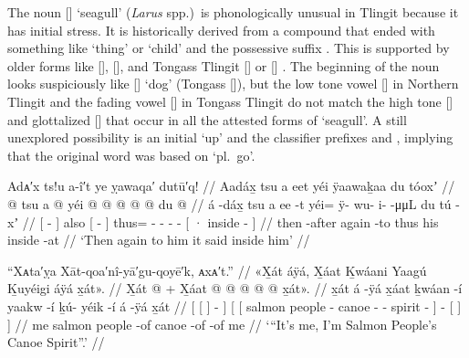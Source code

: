 The noun  [] ‘seagull’ (\textit{Larus} spp.)\ is phonologically unusual in Tlingit because it has initial stress.
It is historically derived from a compound that ended with something like  ‘thing’ or  ‘child’ and the possessive suffix .
This is supported by older forms like  [],  [], and Tongass Tlingit  [] or  [] \parencite[all][f06/66]{leer:1973}.
The beginning of the noun looks suspiciously like  [] ‘dog’ (Tongass  []), but the low tone vowel [] in Northern Tlingit and the fading vowel [] in Tongass Tlingit do not match the high tone [] and glottalized [] that occur in all the attested forms of ‘seagull’.
A still unexplored possibility is an initial  ‘up’ and the classifier prefixes  and , implying that the original word was based on  ‘pl.\ go’.

\ex\label{ex:100-163-again-spoke}%
%
\begingl
	\glpreamble	Adᴀ′x ts!u a-î′t ye ỵawaqa′ dutū′q! //
	\glpreamble	Aadáx̱ tsu a eet yéi ÿaawaḵaa du tóoxʼ //
	\gla	{}  @ {} {} tsu
		{} a  @ {} {}
		yéi @  @ {} @ {} @ {} @ {}
		{} du  @ {} {} //
	\glb	{} á -dáx̱ {} tsu
		{} a ee -t {}
		yéi= ÿ- wu- i-  -μμL
		{} du tú -xʼ {} //
	\glc	{}[  - {}] also 
		{}[   - {}]
		thus= - - -  -
		{}[ · inside - {}] //
	\gld	{} then -after {} again
		{}  {} -to {}
		thus  {} {} {} {}
		{} his inside -at {} //
	\glft	‘Then again to him it said inside him’
		//
\endgl
\xe

\ex\label{ex:100-164-its-me-salmon-canoe}%
%
\begingl
	\glpreamble	“Xᴀta′ỵa Xāt-qoa′nî-yā′gu-qoyē′k, ᴀxᴀ′t.” //
	\glpreamble	«\!X̱át áÿá, X̱áat Ḵwáani Yaagú Ḵuyéigi áÿá x̱át\!». //
	\gla	{} {} X̱át {}  @ {} {} +
		{} {} X̱áat  @ {}  @ {}  @ {} @ {} {}
			 @ {}
			{} x̱át\!». {} {} //
	\glb	{} {} x̱át {} á -ÿá {}
		{} {} x̱áat ḵwáan -í yaakw -í ḵú- yéik -í {} 
			á -ÿá
			{} x̱át {} {} //
	\glc	{}[ {}[  {}]  - {}]
		{}[ {}[ salmon people - canoe - - spirit - {}]
			 -
			{}[  {}] {}] //
	\gld	{} {} me {}  {} {}
		{} {} salmon people -of canoe -of  {} -of {} 
			 {} 
			{} me {} {} //
	\glft	‘“It’s me, I’m Salmon People’s Canoe Spirit”.’
		//
\endgl
\xe

